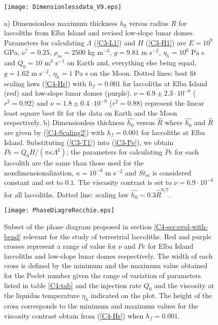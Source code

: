 \begin{figure}[h!]
  \begin{center}
    \graphicspath{ {/Users/thorey/Documents/These/Projet/Refroidissement/Skin_Model/Figure/Figure_Heating/} }
    \texttt{[image: Dimensionlessdata\_V9.eps]}
    \caption{a)  Dimensionless maximum  thickness $h_0$  versus radius
      $R$ for laccoliths from Elba  Island and revised low-slope lunar
      domes.  Parameters  for calculating $\Lambda$  (\ref{C3-L1}) and
      $H$    (\ref{C3-H1})    are    $E=10^9$    GPa,    $\nu^*=0.25$,
      $\rho_m = 2500$ kg m$^{-3}$, $g=9.81$ m s$^{-2}$, $\eta_h =10^6$
      Pa s and $Q_0 = 10$ m$^3$ s$^{-1}$ on Earth and, everything else
      being equal, $g=1.62$ m s$^{-2}$, $\eta_h  =1$ Pa s on the Moon.
      Dotted  lines:   best  fit   scaling  laws   (\ref{C4-Hr})  with
      $h_f = 0.001$ for laccoliths  at Elba Island (red) and low-slope
      lunar  domes  (purple).   $\nu   =  6.9\pm  2.3  \cdot  10^{-8}$
      ($r^2=0.92$) and  $\nu = 1.8\pm 0.4  \cdot 10^{-8}$ ($r^2=0.88$)
      represent the linear least square best fit for the data on Earth
      and   the  Moon   respectively.    b)  Dimensionless   thickness
      $\hat{h_0}$ versus $\hat{R}$ where $\hat{h_0}$ and $\hat{R}$ are
      given by (\ref{C4-Scaling2}) with  $h_f=0.001$ for laccoliths at
      Elba Island.  Substituting  (\ref{C3-T1}) into (\ref{C3-Pe}), we
      obtain $Pe = Q_0 H  /(\pi \kappa \Lambda^2)$; the parameters for
      calculating $Pe$ for each laccolith are the same than those used
      for the  nondimensionalization, $\kappa=10^{-6}$ m  s$^{-2}$ and
      $St_m$ is considered  constant and set to  $0.1$.  The viscosity
      contrast is set  to $\nu =6.9\cdot 10^{-8}$  for all laccoliths.
      Dotted line: scaling law $ \hat{h_0} \sim 0.3\hat{R}^{8/7}$.}
    \label{C4-Data}
  \end{center}
\end{figure}

\begin{figure}[h!]
  \begin{center}
    \graphicspath{ {/Users/thorey/Documents/These/Projet/Refroidissement/Skin_Model/Figure/Figure_Heating/} }
    \texttt{[image: PhaseDiagreRocchie.eps]}
    \caption{Subset  of   the  phase   diagram  proposed   in  section
      \ref{C4-sec:evol-with-bend}   relevant   for    the   study   of
      terrestrial laccoliths. Red and purple crosses represent a range
      of  value for  $\nu$ and  $Pe$  for Elba  Island laccoliths  and
      low-slope lunar domes  respectively. The width of  each cross is
      defined by  the minimum and  the maximum value obtained  for the
      Peclet number given the range  of variation of parameters listed
      in  table \ref{C4-tab}  and  the injection  rate  $Q_0$ and  the
      viscosity at the liquidus  temperature $\eta_h$ indicated on the
      plot. The  height of  the cross corresponds  to the  minimum and
      maximum   values  for   the  viscosity   contrast  obtain   from
      (\ref{C4-Hr}) when $h_f=0.001$.}
    \label{C4-PhaseDiag}
  \end{center}
\end{figure}

